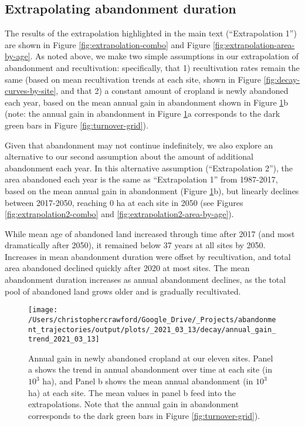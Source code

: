 \documentclass[9pt,twocolumn,twoside,lineno]{pnas-new}
\begin{document}
\newpage

\hypertarget{section-extrapolation-si}{%
\subsection{Extrapolating abandonment duration}\label{section-extrapolation-si}}

The results of the extrapolation highlighted in the main text (``Extrapolation 1'') are shown in Figure \ref{fig:extrapolation-combo} and Figure \ref{fig:extrapolation-area-by-age}.
As noted above, we make two simple assumptions in our extrapolation of abandonment and recultivation: specifically, that 1) recultivation rates remain the same (based on mean recultivation trends at each site, shown in Figure \ref{fig:decay-curves-by-site}, and that 2) a constant amount of cropland is newly abandoned each year, based on the mean annual gain in abandonment shown in Figure \ref{fig:annual-gain-trend}b (note: the annual gain in abandonment in Figure \ref{fig:annual-gain-trend}a corresponds to the dark green bars in Figure \ref{fig:turnover-grid}).

Given that abandonment may not continue indefinitely, we also explore an alternative to our second assumption about the amount of additional abandonment each year.
In this alternative assumption (``Extrapolation 2''), the area abandoned each year is the same as ``Extrapolation 1'' from 1987-2017, based on the mean annual gain in abandonment (Figure \ref{fig:annual-gain-trend}b), but linearly declines between 2017-2050, reaching 0 ha at each site in 2050 (see Figures \ref{fig:extrapolation2-combo} and \ref{fig:extrapolation2-area-by-age}).

While mean age of abandoned land increased through time after 2017 (and most dramatically after 2050), it remained below 37 years at all sites by 2050.
Increases in mean abandonment duration were offset by recultivation, and total area abandoned declined quickly after 2020 at most sites.
The mean abandonment duration increases as annual abandonment declines, as the total pool of abandoned land grows older and is gradually recultivated.



\begin{figure}
\texttt{[image: /Users/christophercrawford/Google\_Drive/\_Projects/abandonment\_trajectories/output/plots/\_2021\_03\_13/decay/annual\_gain\_trend\_2021\_03\_13]} \caption{Annual gain in newly abandoned cropland at our eleven sites. Panel a shows the trend in annual abandonment over time at each site (in \(10^3\) ha), and Panel b shows the mean annual abandonment (in \(10^3\) ha) at each site. The mean values in panel b feed into the extrapolations. Note that the annual gain in abandonment corresponds to the dark green bars in Figure \ref{fig:turnover-grid}).}\label{fig:annual-gain-trend}
\end{figure}
\end{document}
